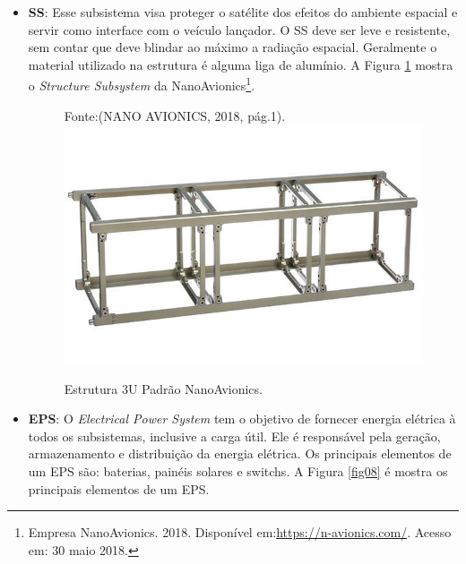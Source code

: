 \begin{itemize}
	
	\item \textbf{SS}: Esse subsistema visa proteger o satélite dos efeitos do ambiente espacial e servir como interface com o veículo lançador. O SS deve ser leve e resistente, sem contar que deve blindar ao máximo a radiação espacial. Geralmente o material utilizado na estrutura é alguma liga de alumínio.  A Figura \ref{fig07} mostra o \textit{Structure Subsystem} da NanoAvionics\footnote{Empresa NanoAvionics. 2018. Disponível em:\url{https://n-avionics.com/}. Acesso em: 30 maio 2018.}.
	
	\begin{figure}[h]
		\centering
		Fonte:(NANO AVIONICS, 2018, pág.1).	
		\includegraphics[keepaspectratio=true,scale=0.45]{figuras/cubesat-structure-main.jpg}
		\caption{Estrutura 3U Padrão NanoAvionics.}
		\label{fig07}
	\end{figure}
	\FloatBarrier
	
	\item \textbf{EPS}: O \textit{Electrical Power System} tem o objetivo de fornecer energia elétrica à todos os subsistemas, inclusive a carga útil. Ele é responsável pela geração, armazenamento e distribuição da energia elétrica. Os principais elementos de um EPS são: baterias, painéis solares e switchs. A Figura \ref{fig08} é mostra os principais elementos de um EPS.
	

\end{itemize}
